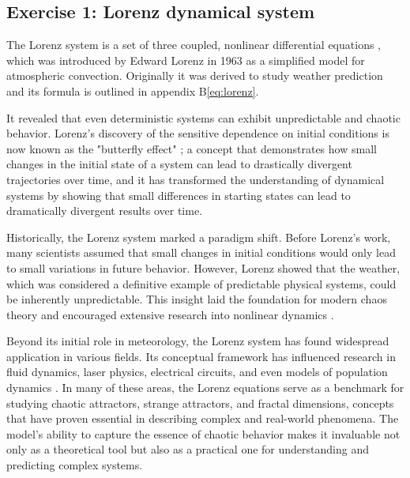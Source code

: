 

\subsection{Exercise 1: Lorenz dynamical system}

The Lorenz system is a set of three coupled, nonlinear differential equations \cite{1963JAtS...20..130L},
 which was introduced by Edward Lorenz in 1963 as a simplified model for atmospheric convection.
  Originally it was derived to study weather prediction and its formula is outlined in appendix B\ref{eq:lorenz}.

It revealed that even deterministic systems can exhibit unpredictable and chaotic behavior. Lorenz's discovery of the sensitive dependence on initial conditions is now known as the "butterfly effect" \cite{apsLorenz2003}; a concept that demonstrates how small changes in the initial state of a system can lead to drastically divergent trajectories over time, and it has transformed the understanding of dynamical systems by showing that small differences in starting states can lead to dramatically divergent results over time.

Historically, the Lorenz system marked a paradigm shift. Before Lorenz's work, many scientists assumed that small changes in initial conditions would only lead to small variations in future behavior. However, Lorenz showed that the weather, which was considered a definitive example of predictable physical systems, could be inherently unpredictable. This insight laid the foundation for modern chaos theory and encouraged extensive research into nonlinear dynamics \cite{apsLorenz2003}.

Beyond its initial role in meteorology, the Lorenz system has found widespread application in various fields. Its conceptual framework has influenced research in fluid dynamics, laser physics, electrical circuits, and even models of population dynamics \cite{kashyap2024lorenz}. In many of these areas, the Lorenz equations serve as a benchmark for studying chaotic attractors, strange attractors, and fractal dimensions, concepts that have proven essential in describing complex and real-world phenomena. The model's ability to capture the essence of chaotic behavior makes it invaluable not only as a theoretical tool but also as a practical one for understanding and predicting complex systems.

